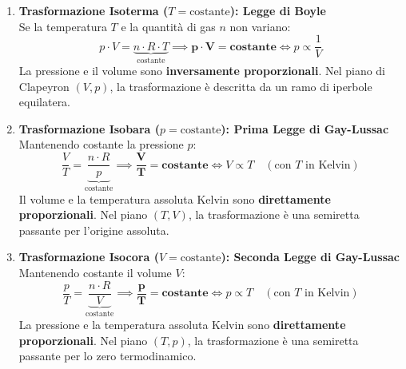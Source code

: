 \documentclass[11pt,a4paper,oneside]{report}
\begin{document}
\begin{enumerate}
  \item \textbf{Trasformazione Isoterma ($T = \text{costante}$): Legge di Boyle}\\
  Se la temperatura $T$ e la quantit\`a di gas $n$ non variano:
  \[
  p \cdot V = \underbrace{n \cdot R \cdot T}_{\text{costante}} \implies \bm{p \cdot V = \text{costante}} \iff p \propto \frac{1}{V}
  \]
  La pressione e il volume sono \textbf{inversamente proporzionali}. Nel piano di Clapeyron $(V, p)$, la trasformazione \`e descritta da un ramo di iperbole equilatera.

  \item \textbf{Trasformazione Isobara ($p = \text{costante}$): Prima Legge di Gay-Lussac}\\
  Mantenendo costante la pressione $p$:
  \[
  \frac{V}{T} = \underbrace{\frac{n \cdot R}{p}}_{\text{costante}} \implies \bm{\frac{V}{T} = \text{costante}} \iff V \propto T \quad (\text{con } T \text{ in Kelvin})
  \]
  Il volume e la temperatura assoluta Kelvin sono \textbf{direttamente proporzionali}. Nel piano $(T, V)$, la trasformazione \`e una semiretta passante per l'origine assoluta.

  \item \textbf{Trasformazione Isocora ($V = \text{costante}$): Seconda Legge di Gay-Lussac}\\
  Mantenendo costante il volume $V$:
  \[
  \frac{p}{T} = \underbrace{\frac{n \cdot R}{V}}_{\text{costante}} \implies \bm{\frac{p}{T} = \text{costante}} \iff p \propto T \quad (\text{con } T \text{ in Kelvin})
  \]
  La pressione e la temperatura assoluta Kelvin sono \textbf{direttamente proporzionali}. Nel piano $(T, p)$, la trasformazione \`e una semiretta passante per lo zero termodinamico.
\end{enumerate}
\end{document}
